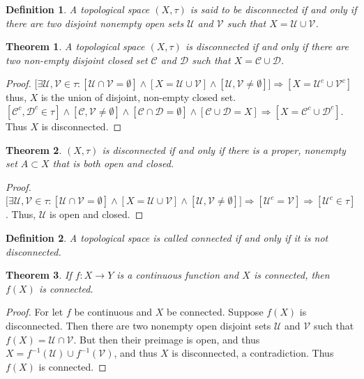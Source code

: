 \documentclass[oneside]{book}
\theoremstyle{mystyle}
\newtheorem{theorem}{Theorem}[section]
\newtheorem{definition}{Definition}[section]
\begin{document}
\begin{definition}
A topological space $(X,\tau)$ is said to be disconnected if and only if there are two disjoint nonempty open sets $\mathcal{U}$ and $\mathcal{V}$ such that $X = \mathcal{U}\cup \mathcal{V}$.
\end{definition}

\begin{theorem}
A topological space $(X,\tau)$ is disconnected if and only if there are two non-empty disjoint closed set $\mathcal{C}$ and $\mathcal{D}$ such that $X=\mathcal{C}\cup\mathcal{D}$.
\end{theorem}
\begin{proof}
$\big[\exists \mathcal{U},\mathcal{V}\in \tau: [\mathcal{U}\cap \mathcal{V}=\emptyset]\land [X=\mathcal{U}\cup \mathcal{V}]\land [\mathcal{U},\mathcal{V}\ne \emptyset]\big]\Rightarrow [X = \mathcal{U}^c\cup \mathcal{V}^c]$ thus, $X$ is the union of disjoint, non-empty closed set. $[\mathcal{C}^c,\mathcal{D}^c\in \tau]\land[\mathcal{C},\mathcal{V}\ne\emptyset]\land[\mathcal{C}\cap \mathcal{D}=\emptyset]\land[\mathcal{C}\cup\mathcal{D}=X]\Rightarrow [X=\mathcal{C}^c\cup\mathcal{D}^c].$ Thus $X$ is disconnected.
\end{proof}

\begin{theorem}
$(X,\tau)$ is disconnected if and only if there is a proper, nonempty set $A\subset X$ that is both open and closed.
\end{theorem}
\begin{proof}
$\big[\exists \mathcal{U},\mathcal{V}\in \tau:[\mathcal{U}\cap \mathcal{V}=\emptyset]\land [X=\mathcal{U}\cup\mathcal{V}]\land[\mathcal{U},\mathcal{V}\ne \emptyset]\big]\Rightarrow [\mathcal{U}^c = \mathcal{V}]\Rightarrow [\mathcal{U}^c\in \tau]$. Thus, $\mathcal{U}$ is open and closed.
\end{proof}

\begin{definition}
A topological space is called connected if and only if it is not disconnected.
\end{definition}

\begin{theorem}
If $f:X\rightarrow Y$ is a continuous function and $X$ is connected, then $f(X)$ is connected.
\end{theorem}
\begin{proof}
For let $f$ be continuous and $X$ be connected. Suppose $f(X)$ is disconnected. Then there are two nonempty open disjoint sets $\mathcal{U}$ and $\mathcal{V}$ such that $f(X) = \mathcal{U}\cap \mathcal{V}$. But then their preimage is open, and thus $X=f^{-1}(\mathcal{U})\cup f^{-1}(\mathcal{V})$, and thus $X$ is disconnected, a contradiction. Thus $f(X)$ is connected.
\end{proof}
\end{document}
